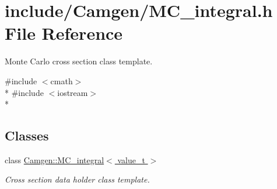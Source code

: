 \hypertarget{a00694}{}\section{include/\+Camgen/\+M\+C\+\_\+integral.h File Reference}
\label{a00694}


Monte Carlo cross section class template.  


{\ttfamily \#include $<$cmath$>$}\\*
{\ttfamily \#include $<$iostream$>$}\\*
\subsection*{Classes}
\begin{DoxyCompactItemize}
\item 
class \hyperlink{a00368}{Camgen\+::\+M\+C\+\_\+integral$<$ value\+\_\+t $>$}
\begin{DoxyCompactList}\small\item\em Cross section data holder class template. \end{DoxyCompactList}\end{DoxyCompactItemize}
